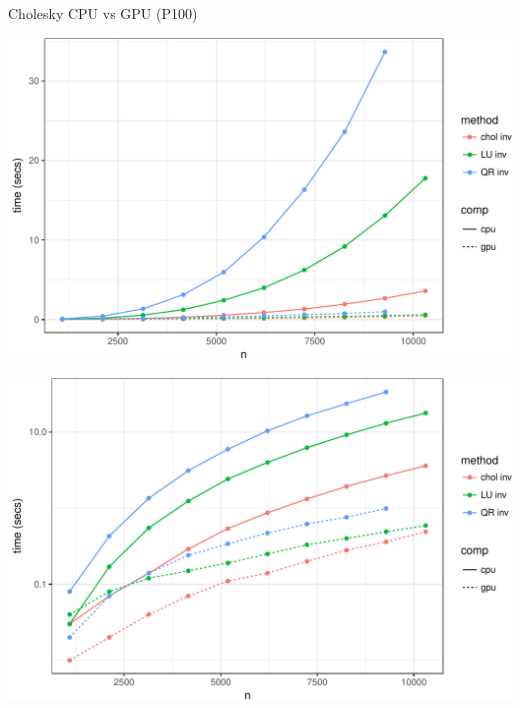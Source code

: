 \documentclass[11pt,ignorenonframetext,]{beamer}
\begin{document}
\begin{frame}{Cholesky CPU vs GPU (P100)}
\protect\hypertarget{cholesky-cpu-vs-gpu-p100}{}

\begin{center}\includegraphics[width=\textwidth]{Lec21_files/figure-beamer/unnamed-chunk-2-1} \end{center}

\end{frame}

\begin{frame}{}
\protect\hypertarget{section}{}

\begin{center}\includegraphics[width=\textwidth]{Lec21_files/figure-beamer/unnamed-chunk-3-1} \end{center}

\end{frame}
\end{document}
